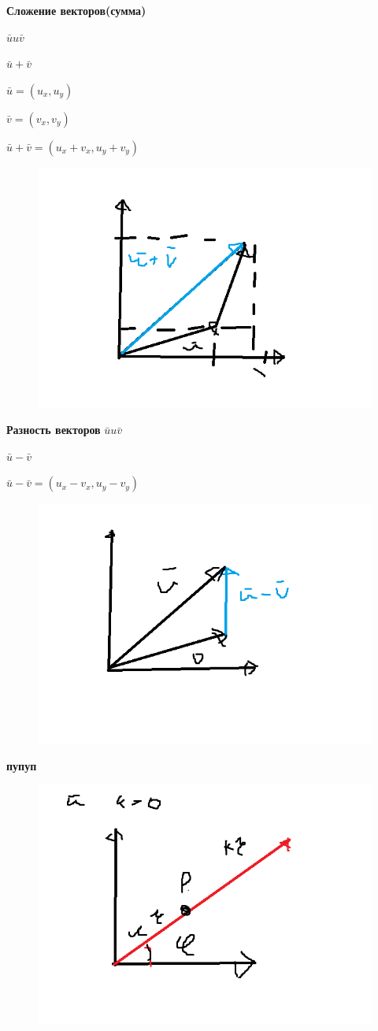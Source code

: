 \documentclass{article}
\begin{document}
\textbf{Сложение векторов(сумма)}

$\bar{u} u \bar{v}$

$\bar{u} + \bar{v}$


$\bar{u} = (u_x,u_y)$

$\bar{v} = (v_x,v_y)$

$\bar{u} + \bar{v} = (u_x+v_x,u_y+v_y)$


\begin{figure} [H]
    \includegraphics[width=0.50\linewidth]{6.png}
\end{figure}

\textbf{Разность векторов}
$\bar{u} u \bar{v}$

$\bar{u} - \bar{v}$


$\bar{u} - \bar{v} = (u_x-v_x,u_y-v_y)$

\begin{figure} [H]
    \includegraphics[width=0.50\linewidth]{7.png}
\end{figure}


\textbf{пупуп }


\begin{figure} [H]
    \includegraphics[width=0.50\linewidth]{8.png}
\end{figure}
\end{document}
